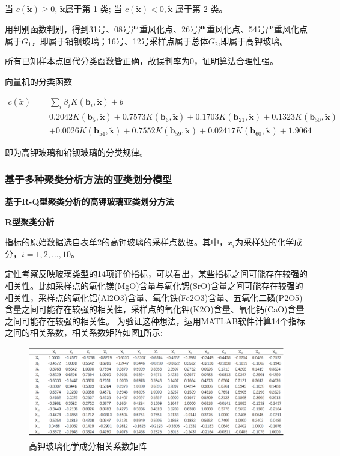 \documentclass{my_paper}
\begin{document}
当 $ c(\tilde{\boldsymbol{x}}) \geqslant 0$, $\tilde{\boldsymbol{x}} $属于第 1 类; 当 $ c(\tilde{\boldsymbol{x}})<0, \tilde{\boldsymbol{x}} $ 属于第 2 类。

用判别函数判别，得到31号、08号严重风化点、26号严重风化点、54号严重风化点属于$G_1$，即属于铅钡玻璃；16号、12号采样点属于总体$G_2$,即属于高钾玻璃。

所有已知样本点回代分类函数皆正确，故误判率为0，证明算法合理性强。

向量机的分类函数

$$
\begin{aligned}
c(\tilde{x})=& \sum_{i} \beta_{i} K\left(\boldsymbol{b}_{i}, \tilde{\boldsymbol{x}}\right)+b \\
=& 0.2042 K\left(\boldsymbol{b}_{5}, \tilde{\boldsymbol{x}}\right)+0.7573 K\left(\boldsymbol{b}_{6}, \tilde{\boldsymbol{x}}\right)+0.1703 K\left(\boldsymbol{b}_{21}, \tilde{\boldsymbol{x}}\right)+0.1323 K\left(\boldsymbol{b}_{50}, \tilde{\boldsymbol{x}}\right) \\
&+0.0026 K\left(\boldsymbol{b}_{54}, \tilde{\boldsymbol{x}}\right)+0.7552 K\left(\boldsymbol{b}_{59}, \tilde{\boldsymbol{x}}\right)+0.02417 K\left(\boldsymbol{b}_{60}, \tilde{\boldsymbol{x}}\right)+1.9064
\end{aligned}$$

即为高钾玻璃和铅钡玻璃的分类规律。

\subsubsection{基于多种聚类分析方法的亚类划分模型}
\noindent
\textbf{基于R-Q型聚类分析的高钾玻璃亚类划分方法}

\textbf{R型聚类分析}

指标的原始数据选自表单2的高钾玻璃的采样点数据。其中，$x_i$为采样处的化学成分，$i=1,2,\dots,10$。

定性考察反映玻璃类型的14项评价指标，可以看出，某些指标之间可能存在较强的相关性。比如采样点的氧化镁(MgO)含量与氧化锶(SrO)含量之间可能存在较强的相关性，采样点的氧化铝(Al2O3)含量、氧化铁(Fe2O3)含量、五氧化二磷(P2O5)含量之间可能存在较强的相关性，采样点的氧化钾(K2O)含量、氧化钙(CaO)含量之间可能存在较强的相关性。
为验证这种想法，运用MATLAB软件计算14个指标之间的相关系数，相关系数矩阵如图\ref{R型聚类}所示:

\begin{figure}[H]
    \centering
    \includegraphics[width=1\textwidth]{3.png}
    \caption{高钾玻璃化学成分相关系数矩阵}
    \label{R型聚类}
\end{figure}
\end{document}
